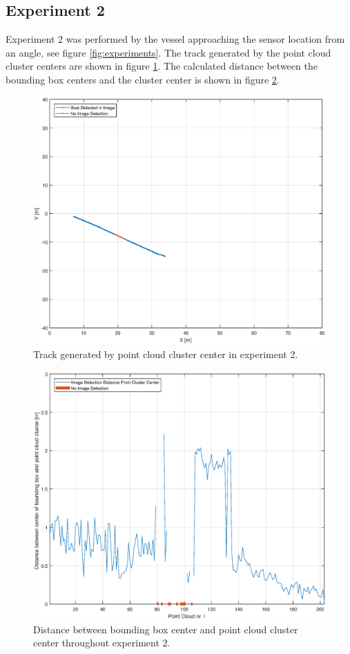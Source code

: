 \subsection{Experiment 2}
Experiment 2 was performed by the vessel approaching the sensor location from an angle, see figure \ref{fig:experiments}. The track generated by the point cloud cluster centers are shown in figure \ref{fig:ex2_track}. The calculated distance between the bounding box centers and the cluster center is shown in figure \ref{fig:ex2_pc_dist}.
\begin{figure}[H]
	\centering
	\includegraphics[width=.8\linewidth]{fig/exp_2_track.eps}
	\caption{Track generated by point cloud cluster center in experiment 2.}
	\label{fig:ex2_track}
\end{figure}
\begin{figure}[H]
	\centering
	\includegraphics[width=.7\linewidth]{fig/exp_2_dist_pr_pc.eps}
	\caption{Distance between bounding box center and point cloud cluster center throughout experiment 2.}
	\label{fig:ex2_pc_dist}
\end{figure}
